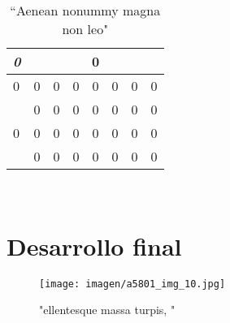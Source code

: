 \documentclass[letterpaper, 12px]{article}
\begin{document}
 
\begin{table}[h]
\centering
\begin{tabular}{|lll|lllllll|}
\hline
\multicolumn{3}{|l|}{\textit{0}}   & \multicolumn{7}{c|}{0}                                                                                                                             \\ 
\hline
\multicolumn{3}{|l|}{0}                  & \multicolumn{1}{l|}{0} & \multicolumn{1}{l|}{0} & \multicolumn{1}{l|}{0} & \multicolumn{1}{l|}{0} & \multicolumn{1}{l|}{0} & \multicolumn{1}{l|}{0} & 0 \\ 
\hline
\multicolumn{3}{|l|}{\multirow{3}{*}{0}} & \multicolumn{1}{l|}{0} & \multicolumn{1}{l|}{0} & \multicolumn{1}{l|}{0} & \multicolumn{1}{l|}{0} & \multicolumn{1}{l|}{0} & \multicolumn{1}{l|}{0} & 0 \\ 
\cline{4-10} 
\multicolumn{3}{|l|}{}                   & \multicolumn{1}{l|}{0} & \multicolumn{1}{l|}{0} & \multicolumn{1}{l|}{0} & \multicolumn{1}{l|}{0} & \multicolumn{1}{l|}{0} & \multicolumn{1}{l|}{0} & 0 \\ 
\cline{4-10} 
\multicolumn{3}{|l|}{}                   & \multicolumn{1}{l|}{0} & \multicolumn{1}{l|}{0} & \multicolumn{1}{l|}{0} & \multicolumn{1}{l|}{0} & \multicolumn{1}{l|}{0} & \multicolumn{1}{l|}{0} & 0 \\ 
\hline

\end{tabular}

\caption{``Aenean nonummy magna non leo"}
\label{tab:datos obtenidos}
\end{table}

 \lipsum[13-14]\\
 
\section*{Desarrollo final}

 \lipsum[15]

\begin{figure}[h]
    \centering
    \texttt{[image: imagen/a5801\_img\_10.jpg]}
    \caption{"ellentesque massa turpis, "}
    \label{fig:gráficas}
\end{figure}
\end{document}

